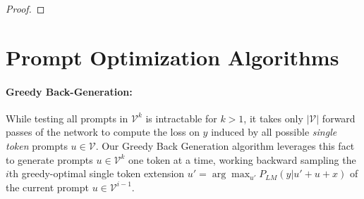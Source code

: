 \documentclass{article} %
\begin{document}
\begin{proof}
    

\end{proof}












\newpage
\section{Prompt Optimization Algorithms}
\label{sec:algs}

\paragraph{Greedy Back-Generation: } While testing all prompts in $\mathcal V^k$ is intractable for $k >1$, it takes only $|\mathcal V|$ forward passes of the network to compute the loss on $y$ induced by all possible \textit{single token} prompts $u \in \mathcal V$. Our Greedy Back Generation algorithm leverages this fact to generate prompts $u\in \mathcal V^k$ one token at a time, working backward sampling the $i$th greedy-optimal single token extension $u' = \arg\max_{u'} P_{LM}(y|u'+u+x)$ of the current prompt $u\in \mathcal V^{i-1}$. 
\end{document}
